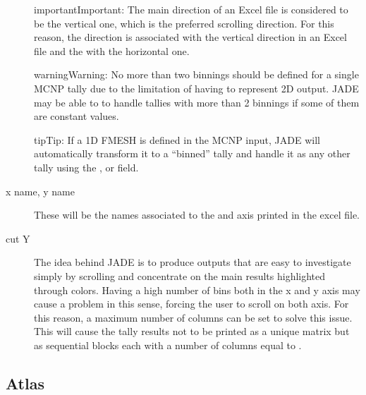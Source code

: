 \documentclass[letterpaper,10pt,english]{sphinxmanual}
\let\sphinxpxdimen\pdfpxdimen\else\newdimen\sphinxpxdimen
\begin{document}
\begin{description}
\begin{sphinxadmonition}{important}{Important:}
\sphinxAtStartPar
The main direction of an Excel file is considered to be the vertical one, which is the preferred scrolling direction.
For this reason, the  direction is associated with the vertical direction in an Excel file and the  with
the horizontal one.
\end{sphinxadmonition}

\begin{sphinxadmonition}{warning}{Warning:}
\sphinxAtStartPar
No more than two binnings should be defined for a single MCNP tally due to the limitation of having to represent
2\sphinxhyphen{}D output. JADE may be able to to handle tallies with more than 2 binnings if some of them are constant
values.
\end{sphinxadmonition}

\begin{sphinxadmonition}{tip}{Tip:}
\sphinxAtStartPar
If a 1D FMESH is defined in the MCNP input, JADE will automatically transform it to a “binned” tally and handle it
as any other tally using the ,  or  field.
\end{sphinxadmonition}

\item[{x name, y name}] \leavevmode
\sphinxAtStartPar
These will be the names associated to the  and  axis printed in the excel file.

\item[{cut Y}] \leavevmode
\sphinxAtStartPar
The idea behind JADE is to produce outputs that are easy to investigate simply by scrolling and concentrate on the
main results highlighted through colors. Having a high number of bins both in the x and y axis may cause a problem
in this sense, forcing the user to scroll on both axis. For this reason, a maximum number of columns can be set to
solve this issue. This will cause the tally results not to be printed as a unique matrix but as sequential blocks
each with a number of columns equal to .

\end{description}


\subsection{Atlas}
\label{\detokenize{usage/configuration:atlas}}
\noindent\sphinxincludegraphics[width=600\sphinxpxdimen]{{atlasbench}.png}
\end{document}

